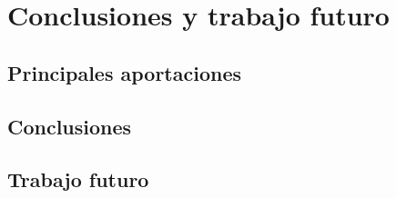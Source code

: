 \section{Conclusiones y trabajo futuro} \label{sec:conc}
    \subsection{Principales aportaciones}
    
    
    
    \subsection{Conclusiones}
    

    \subsection{Trabajo futuro}
        